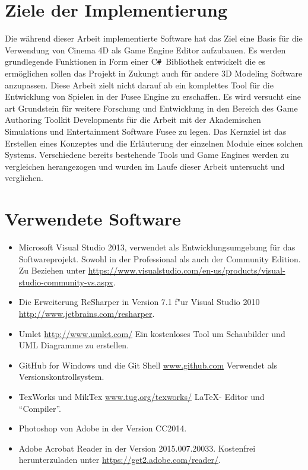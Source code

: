 \documentclass[pagesize, paper=a4, fontsize=12pt, titlepage=true, headings=small, headnosepline, abstractoff, liststotoc, nochapterprefix, plainheadsepline, twoside]{scrreprt}
\newcommand{\CSS}{C\texttt{\# }}
\begin{document}
\section{Ziele der Implementierung}
Die während dieser Arbeit implementierte Software hat das Ziel eine Basis für die Verwendung von Cinema 4D als Game Engine Editor aufzubauen. Es werden grundlegende Funktionen in Form einer \CSS Bibliothek entwickelt die es ermöglichen sollen das Projekt in Zukungt auch für andere 3D Modeling Software anzupassen. Diese Arbeit zielt nicht darauf ab ein komplettes Tool für die Entwicklung von Spielen in der Fusee Engine zu erschaffen. Es wird versucht eine art Grundstein für weitere Forschung und Entwicklung in den Bereich des Game Authoring Toolkit Developments für die Arbeit mit der Akademischen Simulations und Entertainment Software Fusee zu legen. Das Kernziel ist das Erstellen eines Konzeptes und die Erläuterung der einzelnen Module eines solchen Systems. Verschiedene bereits bestehende Tools und Game Engines werden zu vergleichen herangezogen und wurden im Laufe dieser Arbeit untersucht und verglichen.
\section{Verwendete Software}
\begin{itemize}
\item Microsoft Visual Studio 2013, \newline verwendet als Entwicklungsumgebung für das Softwareprojekt. Sowohl in der Professional als auch der Community Edition. Zu Beziehen unter  \url{https://www.visualstudio.com/en-us/products/visual-studio-community-vs.aspx}.
\item Die Erweiterung ReSharper in Version 7.1 f"ur Visual Studio 2010 \url{http://www.jetbrains.com/resharper}.
\item Umlet \url{http://www.umlet.com/} \newline Ein kostenloses Tool um Schaubilder und UML Diagramme zu erstellen.
\item GitHub for Windows und die Git Shell \url{www.github.com} \newline Verwendet als Versionskontrollsystem.
\item TexWorks und MikTex \url{www.tug.org/texworks/} \newline \LaTeX- Editor und “Compiler”.
\item Photoshop von Adobe in der Version CC2014.
\item Adobe Acrobat Reader in der Version 2015.007.20033. Kostenfrei herunterzuladen unter \url{https://get2.adobe.com/reader/}.
\end{itemize}
\end{document}
